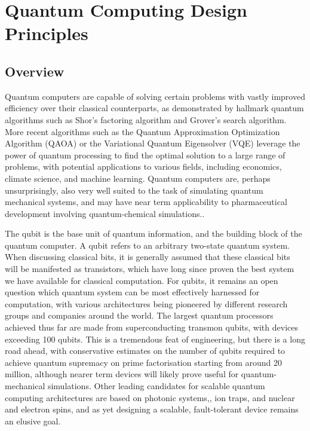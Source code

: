 \documentclass[../Thesis.tex]{subfiles}
\begin{document}
\chapter{Quantum Computing Design Principles}

\section{Overview}

Quantum computers are capable of solving certain problems with vastly improved efficiency over their classical counterparts, as demonstrated by hallmark quantum algorithms such as Shor's factoring algorithm\cite{shor_polynomial-time_1997} and Grover's search algorithm\cite{grover_fast_1996}. %
More recent algorithms such as the Quantum Approximation Optimization Algorithm (QAOA) or the Variational Quantum Eigensolver (VQE) leverage the power of quantum processing to find the optimal solution to a large range of problems, with potential applications to various fields, including economics, climate science, and machine learning\cite{farhi_quantum_2014}. Quantum computers are, perhaps unsurprisingly, also very well suited to the task of simulating quantum mechanical systems, and may have near term applicability to pharmaceutical development involving quantum-chemical simulations.\cite{preskill_quantum_2021,lloyd_universal_1996}.  %

The qubit is the base unit of quantum information, and the building block of the quantum computer. A qubit refers to an arbitrary two-state quantum system. When discussing classical bits, it is generally assumed that these classical bits will be manifested as transistors, which have long since proven the best system we have available for classical computation. For qubits, it remains an open question which quantum system can be most effectively harnessed for computation, with various architectures being pioneered by different research groups and companies around the world.  The largest quantum processors achieved thus far are made from superconducting transmon qubits\cite{krantz_quantum_2019}, with devices exceeding 100 qubits\cite{ball_first_2021}. This is a tremendous feat of engineering, but there is a long road ahead, with conservative estimates on the number of qubits required to achieve quantum supremacy on prime factorisation starting from around 20 million\cite{gidney_how_2021}, although nearer term devices will likely prove useful for quantum-mechanical simulations\cite{childs_toward_2018}. Other leading candidates for scalable quantum computing architectures are based on photonic systems,\cite{slussarenko_photonic_2019}, ion traps\cite{bruzewicz_trapped-ion_2019}, and nuclear and electron spins\cite{vandersypen_interfacing_2017}, and as yet designing a scalable, fault-tolerant device remains an elusive goal.
\end{document}
